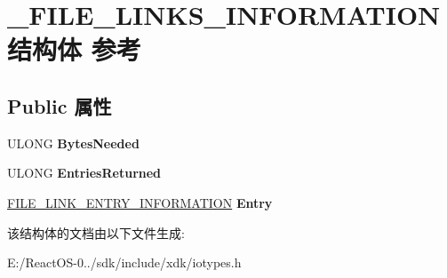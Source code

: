 \hypertarget{struct___f_i_l_e___l_i_n_k_s___i_n_f_o_r_m_a_t_i_o_n}{}\section{\+\_\+\+F\+I\+L\+E\+\_\+\+L\+I\+N\+K\+S\+\_\+\+I\+N\+F\+O\+R\+M\+A\+T\+I\+O\+N结构体 参考}
\label{struct___f_i_l_e___l_i_n_k_s___i_n_f_o_r_m_a_t_i_o_n}
\subsection*{Public 属性}
\begin{DoxyCompactItemize}
\item 
\mbox{\label{struct___f_i_l_e___l_i_n_k_s___i_n_f_o_r_m_a_t_i_o_n_a86b2d4998f1d8513e9535c3eba20c419}} 
U\+L\+O\+NG {\bfseries Bytes\+Needed}
\item 
\mbox{\label{struct___f_i_l_e___l_i_n_k_s___i_n_f_o_r_m_a_t_i_o_n_a009cdfaf68b0000c8a2fcbdb54bf4a1b}} 
U\+L\+O\+NG {\bfseries Entries\+Returned}
\item 
\mbox{\label{struct___f_i_l_e___l_i_n_k_s___i_n_f_o_r_m_a_t_i_o_n_a84b46aeeeed635291afa599cf118779f}} 
\hyperlink{struct___f_i_l_e___l_i_n_k___e_n_t_r_y___i_n_f_o_r_m_a_t_i_o_n}{F\+I\+L\+E\+\_\+\+L\+I\+N\+K\+\_\+\+E\+N\+T\+R\+Y\+\_\+\+I\+N\+F\+O\+R\+M\+A\+T\+I\+ON} {\bfseries Entry}
\end{DoxyCompactItemize}


该结构体的文档由以下文件生成\+:\begin{DoxyCompactItemize}
\item 
E\+:/\+React\+O\+S-\/0../sdk/include/xdk/iotypes.\+h\end{DoxyCompactItemize}
